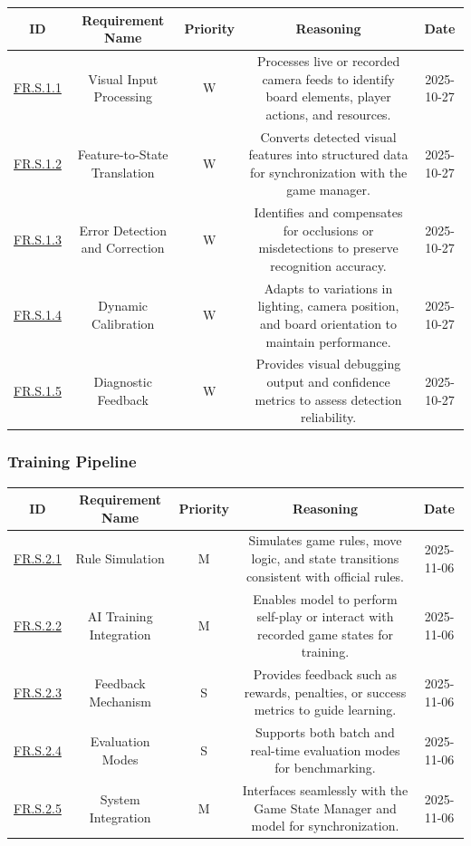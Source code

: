 \documentclass{article}
\begin{document}
\begin{tabular}{|c|c|c|c|c|}
\hline
\textbf{ID} & \textbf{Requirement Name} & \textbf{Priority} &
\textbf{Reasoning} & \textbf{Date} \\
\hline
\hyperref[FR.S.1.1]{FR.S.1.1} & Visual Input Processing & W &
\parbox[t]{4cm}{Processes live or recorded camera feeds to identify board elements, player actions, and resources.} &
2025-10-27 \\
\hline
\hyperref[FR.S.1.2]{FR.S.1.2} & Feature-to-State Translation & W &
\parbox[t]{4cm}{Converts detected visual features into structured \GameState{} data for synchronization with the game manager.} &
2025-10-27 \\
\hline
\hyperref[FR.S.1.3]{FR.S.1.3} & Error Detection and Correction & W &
\parbox[t]{4cm}{Identifies and compensates for occlusions or misdetections to preserve recognition accuracy.} &
2025-10-27 \\
\hline
\hyperref[FR.S.1.4]{FR.S.1.4} & Dynamic Calibration & W &
\parbox[t]{4cm}{Adapts to variations in lighting, camera position, and board orientation to maintain performance.} &
2025-10-27 \\
\hline
\hyperref[FR.S.1.5]{FR.S.1.5} & Diagnostic Feedback & W &
\parbox[t]{4cm}{Provides visual debugging output and confidence metrics to assess detection reliability.} &
2025-10-27 \\
\hline
\end{tabular}

\vspace{1em}

\subsubsection*{Training Pipeline}

\begin{tabular}{|c|c|c|c|c|}
\hline
\textbf{ID} & \textbf{Requirement Name} & \textbf{Priority} &
\textbf{Reasoning} & \textbf{Date} \\
\hline
\hyperref[FR.S.2.1]{FR.S.2.1} & Rule Simulation & M &
\parbox[t]{4cm}{Simulates game rules, move logic, and state transitions consistent with official \emph{\Catan{}} rules.} &
2025-11-06 \\
\hline
\hyperref[FR.S.2.2]{FR.S.2.2} & AI Training Integration & M &
\parbox[t]{4cm}{Enables \AI{} model to perform self-play or interact with recorded game states for training.} &
2025-11-06 \\
\hline
\hyperref[FR.S.2.3]{FR.S.2.3} & Feedback Mechanism & S &
\parbox[t]{4cm}{Provides feedback such as rewards, penalties, or success metrics to guide learning.} &
2025-11-06 \\
\hline
\hyperref[FR.S.2.4]{FR.S.2.4} & Evaluation Modes & S &
\parbox[t]{4cm}{Supports both batch and real-time evaluation modes for \AI{} benchmarking.} &
2025-11-06 \\
\hline
\hyperref[FR.S.2.5]{FR.S.2.5} & System Integration & M &
\parbox[t]{4cm}{Interfaces seamlessly with the Game State Manager and \AI{} model for synchronization.} &
2025-11-06 \\
\hline
\end{tabular}
\vspace{1em}
\end{document}

